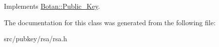 Implements \hyperlink{classBotan_1_1Public__Key_aec4ee42d508712e05388eaa9200c630b}{Botan\-::\-Public\-\_\-\-Key}.



The documentation for this class was generated from the following file\-:\begin{DoxyCompactItemize}
\item 
src/pubkey/rsa/rsa.\-h\end{DoxyCompactItemize}
